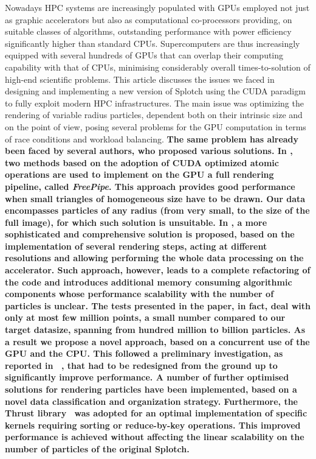 \documentclass[preprint,5pt]{elsarticle}
\begin{document}
Nowadays HPC systems are increasingly populated with GPUs employed not just as graphic accelerators but also as computational co-processors providing, on suitable classes of algorithms, outstanding performance with power efficiency significantly higher than standard CPUs. Supercomputers are thus increasingly equipped with several hundreds of GPUs that can overlap their computing capability with that of CPUs, minimising considerably overall times-to-solution of high-end scientific problems. This article discusses the issues we faced in designing and implementing a new version of Splotch using the CUDA paradigm~\cite{cudaurl} to fully exploit modern HPC infrastructures. The main issue was optimizing the rendering of variable radius particles, dependent both on their intrinsic size and on the point of view, posing several problems for the GPU computation in terms of race conditions and workload balancing. 
{\bf
The same problem has already been faced by several authors, who proposed various solutions. In \cite{liu2010}, two methods based on 
the adoption of CUDA optimized atomic operations are used to implement on the GPU a full rendering pipeline, called {\it FreePipe}. 
This approach provides good performance
when small triangles of homogeneous size have to be drawn. Our data encompasses particles of any radius (from very small, to the size of the full image),
for which such solution is unsuitable. In \cite{laine2011}, a more sophisticated and comprehensive solution
is proposed, based on the implementation of several rendering steps, acting at different resolutions and allowing performing the whole
data processing on the accelerator. Such approach, however, leads to a complete refactoring of the code and introduces 
additional memory consuming algorithmic components whose performance 
scalability with the number of particles is unclear. The tests presented in the paper, in fact, 
deal with only at most few million points, a small number 
compared to our target datasize, spanning from hundred million to billion particles.
As a result we propose a novel approach, based on a concurrent use of the GPU and the CPU.
This followed a
preliminary investigation, as reported in ~\cite{jin:high-performance}, that 
had to be redesigned from the ground up to significantly improve performance. A number of further 
optimised solutions for rendering particles have been implemented, based on a novel data classification and organization strategy. Furthermore, the Thrust library~\cite{thrusturl} was adopted for an optimal implementation of specific kernels requiring sorting or reduce-by-key operations.
This improved performance is achieved without affecting the linear scalability on the number of particles of the original Splotch. 
}
\end{document}
